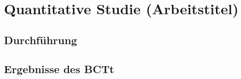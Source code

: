 \chapter[Quantitative Studie]{Quantitative Studie (Arbeitstitel)}
\section{Durchführung}
\section{Ergebnisse des BCTt}
